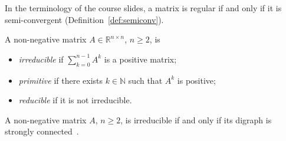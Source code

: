 In the terminology of the course slides, a matrix is regular if and only if it is
semi-convergent (Definition~\ref{def:semiconv}).

\begin{definition}
A non-negative matrix $A \in \mathbb{R}^{n \times n}$, $n \geq 2$, is
\begin{itemize}
  \item[(i)] \emph{irreducible} if $\sum_{k=0}^{n-1} A^k$ is a positive matrix;
  \item[(ii)] \emph{primitive} if there exists $k \in \mathbb{N}$ such that $A^k$ is
              positive;
  \item[(iii)] \emph{reducible} if it is not irreducible.
\end{itemize}
\end{definition}

A non-negative matrix $A$, $n \geq 2$, is irreducible if and only if its digraph is
strongly connected~\cite{baggio_graph}.
% 

